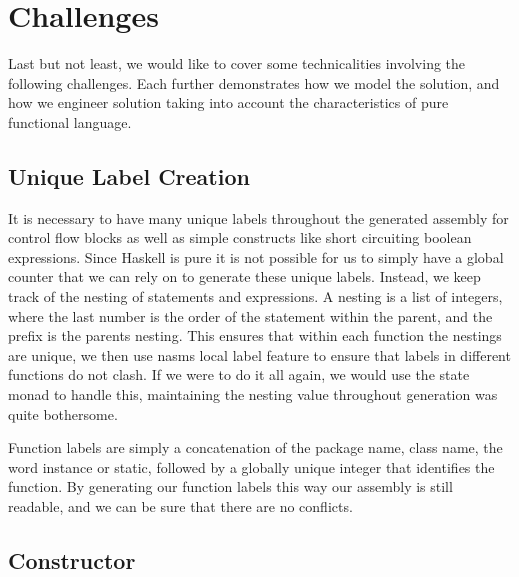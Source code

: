 \documentclass[12pt,letterpaper]{article}
\begin{document}
\section{Challenges}
Last but not least, we would like to cover some technicalities involving the following challenges. Each further demonstrates how we model the solution, and how we engineer solution taking into account the characteristics of pure functional language.

\subsection{Unique Label Creation}
It is necessary to have many unique labels throughout the generated assembly for control flow blocks as well as simple constructs like short circuiting boolean expressions.
Since Haskell is pure it is not possible for us to simply have a global counter that we can rely on to generate these unique labels.
Instead, we keep track of the nesting of statements and expressions.
A nesting is a list of integers, where the last number is the order of the statement within the parent, and the prefix is the parents nesting.
This ensures that within each function the nestings are unique, we then use nasms local label feature to ensure that labels in different functions do not clash.
If we were to do it all again, we would use the state monad to handle this, maintaining the nesting value throughout generation was quite bothersome.

Function labels are simply a concatenation of the package name, class name, the word instance or static, followed by a globally unique integer that identifies the function.
By generating our function labels this way our assembly is still readable, and we can be sure that there are no conflicts.


\subsection{Constructor}
\end{document}
